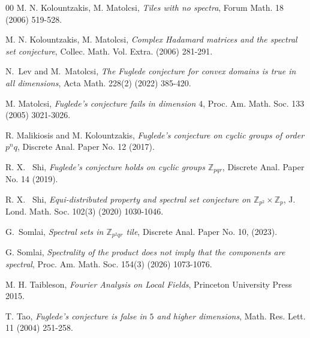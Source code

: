 \documentclass[a4paper,12pt]{amsart}
\begin{document}
\begin{thebibliography}{00}
M. N. Kolountzakis, M. Matolcsi, {\em Tiles with no spectra}, Forum Math.  18 (2006) 519-528.

M. N. Kolountzakis, M. Matolcsi, {\em Complex Hadamard matrices and the
spectral set conjecture},  Collec. Math. Vol. Extra. (2006) 281-291.


N.~Lev and M.~Matolcsi, {\em The Fuglede conjecture for convex domains is true in all dimensions},
Acta Math.  228(2) (2022) 385-420.



M. Matolcsi, {\em Fuglede's conjecture fails in dimension $4$}, Proc. Am. Math. Soc.
133 (2005) 3021-3026.

R. Malikiosis and M. Kolountzakis, {\em Fuglede's conjecture on cyclic groups of order $p^n q$},
 Discrete Anal. Paper No. 12 (2017).

R. X. ~Shi,
{\em Fuglede's conjecture holds on cyclic groups $\mathbb{Z}_{pqr}$},
Discrete Anal. Paper No. 14 (2019).

R. X. ~Shi,
{\em Equi-distributed property and spectral set conjecture on $\mathbb{Z}_{p^2} \times \mathbb{Z}_p$},
J. Lond. Math. Soc.  102(3) (2020) 1030-1046.


G.~Somlai,
{\em Spectral sets in $\mathbb{Z}_{p^{2}qr}$ tile}, Discrete Anal. Paper No. 10, (2023).

G. Somlai, {\em Spectrality of the product does not imply that the components are spectral},
Proc. Am. Math. Soc. 154(3) (2026) 1073-1076.

M. H. Taibleson, {\em Fourier Analysis on Local Fields},  Princeton University Press 2015.

T. Tao, {\em Fuglede's conjecture is false in $5$ and higher dimensions}, Math. Res. Lett. 11 (2004) 251-258.


\end{thebibliography}
\end{document}
